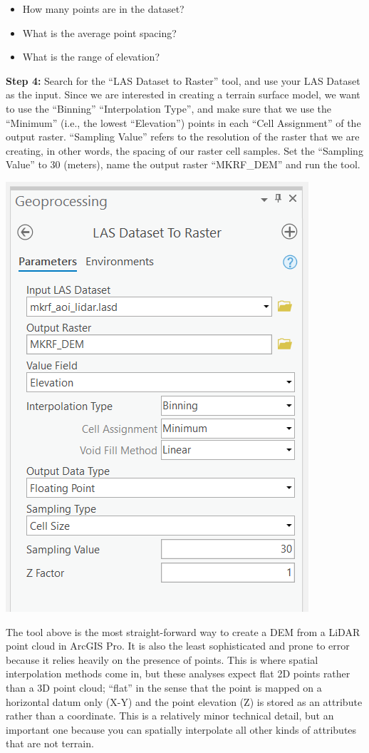 \documentclass[
]{book}
\begin{document}
\begin{itemize}
\item
  How many points are in the dataset?
\item
  What is the average point spacing?
\item
  What is the range of elevation?
\end{itemize}

\textbf{Step 4:} Search for the ``LAS Dataset to Raster'' tool, and use your LAS Dataset as the input. Since we are interested in creating a terrain surface model, we want to use the ``Binning'' ``Interpolation Type'', and make sure that we use the ``Minimum'' (i.e., the lowest ``Elevation'') points in each ``Cell Assignment'' of the output raster. ``Sampling Value'' refers to the resolution of the raster that we are creating, in other words, the spacing of our raster cell samples. Set the ``Sampling Value'' to 30 (meters), name the output raster ``MKRF\_DEM'' and run the tool.

\includegraphics[width=0.5\linewidth]{images/01-arcgis-lasd-to-raster}

The tool above is the most straight-forward way to create a DEM from a LiDAR point cloud in ArcGIS Pro. It is also the least sophisticated and prone to error because it relies heavily on the presence of points. This is where spatial interpolation methods come in, but these analyses expect flat 2D points rather than a 3D point cloud; ``flat'' in the sense that the point is mapped on a horizontal datum only (X-Y) and the point elevation (Z) is stored as an attribute rather than a coordinate. This is a relatively minor technical detail, but an important one because you can spatially interpolate all other kinds of attributes that are not terrain.
\end{document}
